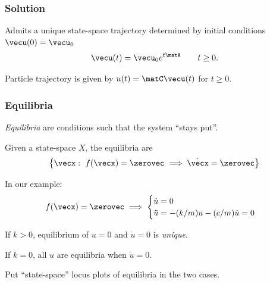 \documentclass[12pt]{beamer}
\begin{document}
\begin{frame}
\frametitle{Solution}

\begin{itemize}

\vitem Admits a unique state-space trajectory determined by initial conditions $\vecu(0) = \vecu_0$
\[
  \vecu(t) = \vecu_0 e^{t \matA }
  \qquad t \geq 0.
\]

\vitem Particle trajectory is given by $u(t) = \matC \vecu(t)$ for $t \geq 0$.

\end{itemize}
\vfill\null

\end{frame}




\begin{frame}
\frametitle{Equilibria}

\begin{itemize}

\vitem \emph{Equilibria} are conditions such that the system ``stays put''.

\vitem Given a state-space $X$, the equilibria are 
\[
\left\{
	\vecx : \ f(\vecx) = \zerovec \implies \dot \vecx = \zerovec
\right\}
\]

\vitem In our example:
\[
f(\vecx) = \zerovec \implies
\begin{cases}
	\dot u = 0	\\
	\ddot u = -(k/m) u - (c/m) \dot u = 0
\end{cases}
\]

\vitem If $k > 0$, equilibrium of $u = 0$ and $\dot u = 0$ is \emph{unique}.

\vitem If $k = 0$, all $u$ are equilibria when $\dot u = 0$.

\end{itemize}

\end{frame}



\begin{frame}

Put ``state-space'' locus plots of equilibria in the two cases.

\end{frame}
\end{document}
